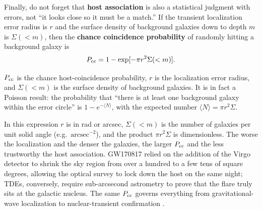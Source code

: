 Finally, do not forget that \textbf{host association} is also a statistical judgment with errors, not ``it looks close so it must be a match.'' If the transient localization error radius is \(r\) and the surface density of background galaxies down to depth \(m\) is \(\Sigma(<m)\), then the \textbf{chance coincidence probability} of randomly hitting a background galaxy is
\begin{equation}
  P_{\rm cc}=1-\exp[-\pi r^2\Sigma(<m)].
  \label{eq:e20-chance-coincidence}
\end{equation}
\begin{formulaexplain}
\(P_{\rm cc}\) is the chance host-coincidence probability, \(r\) is the localization error radius, and \(\Sigma(<m)\) is the surface density of background galaxies. It is in fact a Poisson result: the probability that ``there is at least one background galaxy within the error circle'' is \(1-e^{-\langle N\rangle}\), with the expected number \(\langle N\rangle=\pi r^2\Sigma\).
\end{formulaexplain}
In this expression \(r\) is in rad or arcsec, \(\Sigma(<m)\) is the number of galaxies per unit solid angle (e.g.\ \(\mathrm{arcsec^{-2}}\)), and the product \(\pi r^2\Sigma\) is dimensionless. The worse the localization and the denser the galaxies, the larger \(P_{\rm cc}\) and the less trustworthy the host association. GW170817 relied on the addition of the Virgo detector to shrink the sky region from over a hundred to a few tens of square degrees, allowing the optical survey to lock down the host on the same night; TDEs, conversely, require sub-arcsecond astrometry to prove that the flare truly sits at the galactic nucleus. The same \(P_{\rm cc}\) governs everything from gravitational-wave localization to nuclear-transient confirmation \citep{2017PhRvL.119p1101A,2017ApJ...848L..12A,2019ApJ...872..198V}.

